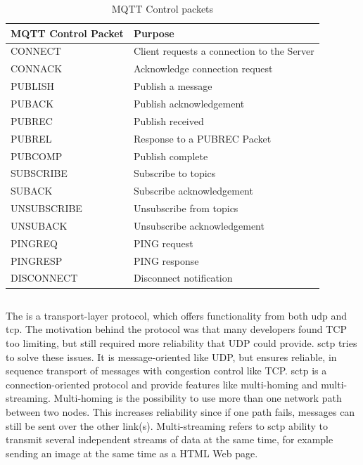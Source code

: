 \begin{table}[h]
\begin{tabularx}{\textwidth}{| X | X |}
\hline
  \textbf{MQTT Control Packet} & \textbf{Purpose} \\ \hline
  CONNECT & Client requests a connection to the Server \\ \hline
  CONNACK & Acknowledge connection request \\ \hline
  PUBLISH & Publish a message \\ \hline
  PUBACK & Publish acknowledgement \\ \hline
  PUBREC &  Publish received \\ \hline
  PUBREL & Response to a PUBREC Packet \\ \hline
  PUBCOMP & Publish complete \\ \hline
  SUBSCRIBE & Subscribe to topics \\ \hline
  SUBACK & Subscribe acknowledgement\\ \hline
  UNSUBSCRIBE & Unsubscribe from topics\\ \hline
  UNSUBACK & Unsubscribe acknowledgement \\ \hline
  PINGREQ & PING request \\ \hline
  PINGRESP & PING response \\ \hline
  DISCONNECT & Disconnect notification \\ \hline
\end{tabularx}
\caption{MQTT Control packets}
\label{table:mqtt-packets}
\end{table}


\subsection{}

The  is a transport-layer protocol, which offers
functionality from both \gls{udp} and \gls{tcp}\cite{rfc-sctp}. The motivation
behind the protocol was that many developers found TCP too limiting, but still
required more reliability that UDP could provide. \gls{sctp} tries to solve
these issues. It is message-oriented like UDP, but ensures reliable, in sequence
transport of messages with congestion control like TCP. \gls{sctp} is a
connection-oriented protocol and provide features like multi-homing and
multi-streaming. Multi-homing is the possibility to use more than one network
path between two nodes. This increases reliability since if one path fails,
messages can still be sent over the other link(s). Multi-streaming refers to
\gls{sctp} ability to transmit several independent streams of data at the same
time, for example sending an image at the same time as a HTML Web page.

